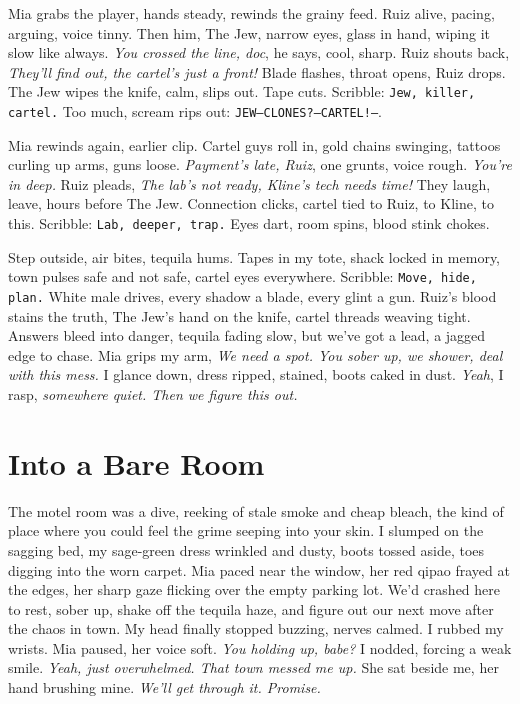 \documentclass[12pt,oneside]{book}
\newcommand{\note}[1]{\texttt{#1}}
\begin{document}
Mia grabs the player, hands steady, rewinds the grainy feed. Ruiz alive, pacing, arguing, voice tinny. Then him, The Jew, narrow eyes, glass in hand, wiping it slow like always. \textit{You crossed the line, doc}, he says, cool, sharp. Ruiz shouts back, \textit{They’ll find out, the cartel’s just a front!} Blade flashes, throat opens, Ruiz drops. The Jew wipes the knife, calm, slips out. Tape cuts. Scribble: \note{Jew, killer, cartel.} Too much, scream rips out: \note{JEW—CLONES?—CARTEL!—}.

Mia rewinds again, earlier clip. Cartel guys roll in, gold chains swinging, tattoos curling up arms, guns loose. \textit{Payment’s late, Ruiz}, one grunts, voice rough. \textit{You’re in deep.} Ruiz pleads, \textit{The lab’s not ready, Kline’s tech needs time!} They laugh, leave, hours before The Jew. Connection clicks, cartel tied to Ruiz, to Kline, to this. Scribble: \note{Lab, deeper, trap.} Eyes dart, room spins, blood stink chokes.

Step outside, air bites, tequila hums. Tapes in my tote, shack locked in memory, town pulses safe and not safe, cartel eyes everywhere. Scribble: \note{Move, hide, plan.} White male drives, every shadow a blade, every glint a gun. Ruiz’s blood stains the truth, The Jew’s hand on the knife, cartel threads weaving tight. Answers bleed into danger, tequila fading slow, but we’ve got a lead, a jagged edge to chase. Mia grips my arm, \textit{We need a spot. You sober up, we shower, deal with this mess.} I glance down, dress ripped, stained, boots caked in dust. \textit{Yeah}, I rasp, \textit{somewhere quiet. Then we figure this out.}

\chapter{Into a Bare Room}

The motel room was a dive, reeking of stale smoke and cheap bleach, the kind of place where you could feel the grime seeping into your skin. I slumped on the sagging bed, my sage-green dress wrinkled and dusty, boots tossed aside, toes digging into the worn carpet. Mia paced near the window, her red qipao frayed at the edges, her sharp gaze flicking over the empty parking lot. We’d crashed here to rest, sober up, shake off the tequila haze, and figure out our next move after the chaos in town. My head finally stopped buzzing, nerves calmed. I rubbed my wrists. Mia paused, her voice soft. \textit{You holding up, babe?} I nodded, forcing a weak smile. \textit{Yeah, just overwhelmed. That town messed me up.} She sat beside me, her hand brushing mine. \textit{We’ll get through it. Promise.}
\end{document}
